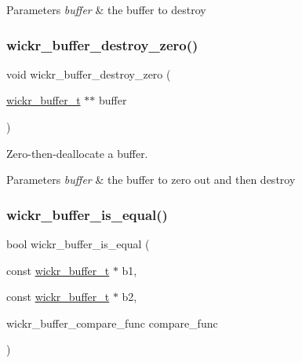 \begin{DoxyParams}{Parameters}
{\em buffer} & the buffer to destroy \\
\hline
\end{DoxyParams}
\mbox{\label{group__wickr__buffer_gaf0ff6486debbfd676b7675f6f899fc40}} 
\subsubsection{\texorpdfstring{wickr\+\_\+buffer\+\_\+destroy\+\_\+zero()}{wickr\_buffer\_destroy\_zero()}}
{\footnotesize\ttfamily void wickr\+\_\+buffer\+\_\+destroy\+\_\+zero (\begin{DoxyParamCaption}\item[{\hyperlink{structwickr__buffer}{wickr\+\_\+buffer\+\_\+t} $\ast$$\ast$}]{buffer }\end{DoxyParamCaption})}



Zero-\/then-\/deallocate a buffer. 


\begin{DoxyParams}{Parameters}
{\em buffer} & the buffer to zero out and then destroy \\
\hline
\end{DoxyParams}
\mbox{\label{group__wickr__buffer_ga51ec58848ab0b07d164c6f7d73200c24}} 
\subsubsection{\texorpdfstring{wickr\+\_\+buffer\+\_\+is\+\_\+equal()}{wickr\_buffer\_is\_equal()}}
{\footnotesize\ttfamily bool wickr\+\_\+buffer\+\_\+is\+\_\+equal (\begin{DoxyParamCaption}\item[{const \hyperlink{structwickr__buffer}{wickr\+\_\+buffer\+\_\+t} $\ast$}]{b1,  }\item[{const \hyperlink{structwickr__buffer}{wickr\+\_\+buffer\+\_\+t} $\ast$}]{b2,  }\item[{wickr\+\_\+buffer\+\_\+compare\+\_\+func}]{compare\+\_\+func }\end{DoxyParamCaption})}




